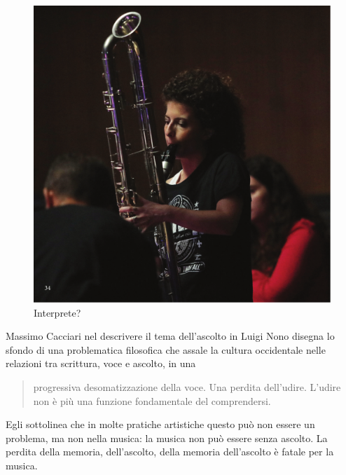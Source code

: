 \documentclass{gs-adonis}
\begin{document}

\begin{figure}[t]
  \centering
  \includegraphics[width=\linewidth]{images/panthera.pdf}
  \captionsetup{width=.81\linewidth}
  \caption{Interprete?}
  \label{alice}
\end{figure}

Massimo Cacciari nel descrivere il tema dell'ascolto in Luigi Nono
\cite{Cacciari1995} disegna lo sfondo di una problematica filosofica che assale
la cultura occidentale nelle relazioni tra scrittura, voce e ascolto, %
in una

\begin{quote}
  progressiva desomatizzazione della voce. Una perdita dell'udire. L'udire
  non è più una funzione fondamentale del comprendersi. \cite{Cacciari1995}
\end{quote}

Egli sottolinea che in molte pratiche artistiche questo può non essere un
problema, ma non nella musica: la musica non può essere senza ascolto.
La perdita della memoria, dell'ascolto, della memoria dell'ascolto è fatale
per la musica. %
\end{document}
